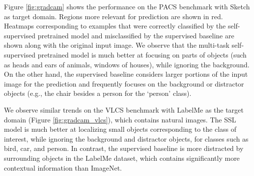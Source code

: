 \documentclass[runningheads]{llncs}
\begin{document}
Figure \ref{fig:gradcam} shows the performance on the PACS benchmark with Sketch as target domain. Regions more relevant for prediction are shown in red.  Heatmaps corresponding to examples that were correctly classified by the self-supervised pretrained model and misclassified by the supervised baseline are shown along with the original input image. We observe that the multi-task self-supervised pretrained model is much better at focusing on parts of objects (such as heads and ears of animals, windows of houses), while ignoring the background. On the other hand, the supervised baseline considers larger portions of the input image for the prediction and frequently focuses on the background or distractor objects (e.g., the chair besides a person for the `person' class). 

We observe similar trends on the VLCS benchmark with LabelMe as the target domain (Figure \ref{fig:gradcam_vlcs}), which contains natural images. The SSL model is much better at localizing small objects corresponding to the class of interest, while ignoring the background and distractor objects, for classes such as bird, car, and person. In contrast, the supervised baseline is more distracted by surrounding objects in the LabelMe dataset, which contains significantly more contextual information than ImageNet. 
\end{document}
